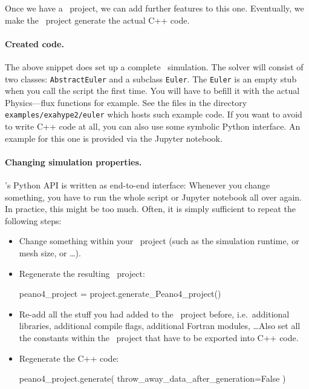 \noindent
Once we have a \Peano\ project, we can add further features to this one.
Eventually, we make the \Peano\ project generate the actual C++ code.


\paragraph{Created code.}
The above snippet does set up a complete \ExaHyPE\ simulation.
The solver will consist of two classes: \texttt{AbstractEuler} and a subclass
\texttt{Euler}.
The \texttt{Euler} is an empty stub when you call the script the first time.
You will have to befill it with the actual Physics---flux functions for example.
See the files in the directory \texttt{examples/exahype2/euler} which hosts such
example code. 
If you want to avoid to write C++ code at all, you can also use some symbolic
Python interface. 
An example for this one is provided via the Jupyter notebook.


\paragraph{Changing simulation properties.}
\ExaHyPE's Python API is written as end-to-end interface:
Whenever you change something, you have to run the whole script or Jupyter
notebook all over again.
In practice, this might be too much. 
Often, it is simply sufficient to repeat the following steps:

\begin{itemize}
  \item Change something within your \ExaHyPE\ project (such as the simulation
  runtime, or mesh size, or \ldots).
  \item Regenerate the resulting \Peano\ project: 
  \begin{code}
peano4_project = project.generate_Peano4_project()
  \end{code}
  \item Re-add all the stuff you had added to the \Peano\ project before,
  i.e.~additional libraries, additional compile flags, additional
  Fortran modules, \ldots Also set all the constants within the \Peano\ project
  that have to be exported into C++ code.
  \item Regenerate the C++ code:
  \begin{code}
peano4_project.generate( throw_away_data_after_generation=False )  
  \end{code}
\end{itemize}



